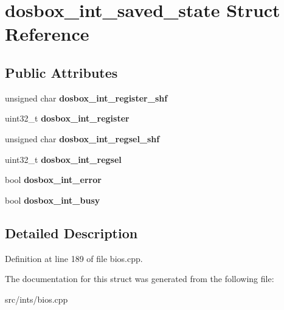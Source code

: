 \hypertarget{structdosbox__int__saved__state}{\section{dosbox\-\_\-int\-\_\-saved\-\_\-state Struct Reference}
\label{structdosbox__int__saved__state}
}
\subsection*{Public Attributes}
\begin{DoxyCompactItemize}
\item 
\hypertarget{structdosbox__int__saved__state_a3190dad41dc7ebdb7a5e478c37fba33e}{unsigned char {\bfseries dosbox\-\_\-int\-\_\-register\-\_\-shf}}\label{structdosbox__int__saved__state_a3190dad41dc7ebdb7a5e478c37fba33e}

\item 
\hypertarget{structdosbox__int__saved__state_a4cf4d84310e8ea530f67d12b6dd47aca}{uint32\-\_\-t {\bfseries dosbox\-\_\-int\-\_\-register}}\label{structdosbox__int__saved__state_a4cf4d84310e8ea530f67d12b6dd47aca}

\item 
\hypertarget{structdosbox__int__saved__state_a8baf767617af9ec07f8179944c14d327}{unsigned char {\bfseries dosbox\-\_\-int\-\_\-regsel\-\_\-shf}}\label{structdosbox__int__saved__state_a8baf767617af9ec07f8179944c14d327}

\item 
\hypertarget{structdosbox__int__saved__state_a22e6fa7e3be634cbbc53513c894a9612}{uint32\-\_\-t {\bfseries dosbox\-\_\-int\-\_\-regsel}}\label{structdosbox__int__saved__state_a22e6fa7e3be634cbbc53513c894a9612}

\item 
\hypertarget{structdosbox__int__saved__state_ad5b90f6e340dc6be7d0f6c1cd9c24056}{bool {\bfseries dosbox\-\_\-int\-\_\-error}}\label{structdosbox__int__saved__state_ad5b90f6e340dc6be7d0f6c1cd9c24056}

\item 
\hypertarget{structdosbox__int__saved__state_a61744b295bdc81881e4d05f2bd22f194}{bool {\bfseries dosbox\-\_\-int\-\_\-busy}}\label{structdosbox__int__saved__state_a61744b295bdc81881e4d05f2bd22f194}

\end{DoxyCompactItemize}


\subsection{Detailed Description}


Definition at line 189 of file bios.\-cpp.



The documentation for this struct was generated from the following file\-:\begin{DoxyCompactItemize}
\item 
src/ints/bios.\-cpp\end{DoxyCompactItemize}
